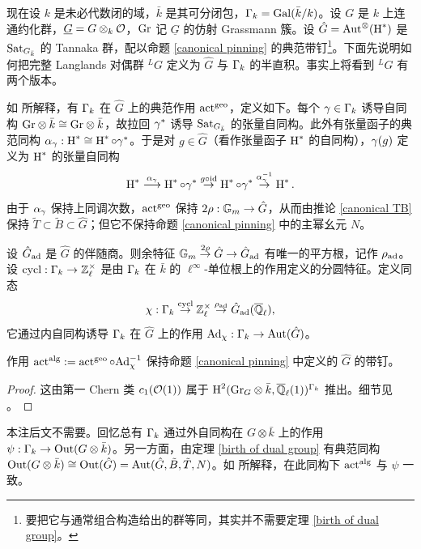 现在设 $k$ 是未必代数闭的域，$\bar k$ 是其可分闭包，${\Gamma}_k={\operatorname{Gal}}(\bar k/k)$。设 $G$ 是 $k$ 上连通约化群，$\underline G=G\otimes_k{\mathcal O}$，${\operatorname{Gr}}$ 记 $\underline G$ 的仿射 Grassmann 簇。设 $\hat G={\operatorname{Aut}}^{\otimes}(\operatorname{H}^*)$ 是 ${\operatorname{Sat}}_{G_{\bar k}}$ 的 Tannaka 群，配以命题 \ref{canonical pinning} 的典范带钉\footnote{要把它与通常组合构造给出的群等同，其实并不需要定理 \ref{birth of dual group}。}。下面先说明如何把完整 Langlands 对偶群 ${^L}G$ 定义为 $\hat G$ 与 ${\Gamma}_k$ 的半直积。事实上将看到 ${^L}G$ 有两个版本。

如 \cite{RZ} 所解释，有 ${\Gamma}_k$ 在 $\hat G$ 上的典范作用 $\operatorname{act}^{\operatorname{geo}}$，定义如下。每个 ${\gamma}\in {\Gamma}_k$ 诱导自同构 ${\operatorname{Gr}}\otimes \bar k\cong {\operatorname{Gr}}\otimes \bar k$，故拉回 ${\gamma}^*$ 诱导 ${\operatorname{Sat}}_{G_{\bar k}}$ 的张量自同构。此外有张量函子的典范同构 ${\alpha}_{\gamma}: \operatorname{H}^*\cong \operatorname{H}^*\circ {\gamma}^*$。于是对 $g\in \hat G$（看作张量函子 $\operatorname{H}^*$ 的自同构），${\gamma}(g)$ 定义为 $\operatorname{H}^*$ 的张量自同构
\begin{equation}\label{gaaction}
\operatorname{H}^*\stackrel{{\alpha}_{\gamma}}{\longrightarrow}\operatorname{H}^*\circ{\gamma}^*\stackrel{g\circ {\operatorname{id}}}{\to}\operatorname{H}^*\circ{\gamma}^*\stackrel{{\alpha}^{-1}_{\gamma}}{\to}\operatorname{H}^*.
\end{equation}
由于 ${\alpha}_{\gamma}$ 保持上同调次数，$\operatorname{act}^{\operatorname{geo}}$ 保持 $2\rho:{\mathbb G}_m\to \hat G$，从而由推论 \ref{canonical TB} 保持 $\tilde T\subset \tilde B\subset \hat G$；但它不保持命题 \ref{canonical pinning} 中的主幂幺元 $N$。

设 $\hat G_{\operatorname{ad}}$ 是 $\hat G$ 的伴随商。则余特征 ${\mathbb G}_m\stackrel{2\rho}{\to} \hat G\to \hat G_{\operatorname{ad}}$ 有唯一的平方根，记作 $\rho_{\operatorname{ad}}$。设 $\operatorname{cycl}:{\Gamma}_k\to{\mathbb Z}_\ell^\times$ 是由 ${\Gamma}_k$ 在 $\bar k$ 的 $\ell^\infty$-单位根上的作用定义的分圆特征。定义同态
\[\chi:{\Gamma}_k\stackrel{\operatorname{cycl}}{\to} {\mathbb Z}_\ell^\times\stackrel{\rho_{\operatorname{ad}}}{\to} \hat G_{{\operatorname{ad}}}({\overline{{\mathbb Q}}_\ell}),\]
它通过内自同构诱导 ${\Gamma}_k$ 在 $\hat G$ 上的作用 ${\operatorname{Ad}}_{\chi}:{\Gamma}_k\to{\operatorname{Aut}}(\hat G)$。

\begin{lem}\label{comparison}
作用 $\operatorname{act}^{\operatorname{alg}}:=\operatorname{act}^{\operatorname{geo}}\circ {\operatorname{Ad}}^{-1}_{\chi}$ 保持命题 \ref{canonical pinning} 中定义的 $\hat G$ 的带钉。
\end{lem}

\begin{proof}
这由第一 Chern 类 $c_1({\mathcal O}(1))$ 属于 $\operatorname{H}^2({\operatorname{Gr}}_G\otimes\bar k, {\overline{{\mathbb Q}}_\ell}(1))^{{\Gamma}_k}$ 推出。细节见 \cite[Proposition A.6]{RZ}。
\end{proof}

\begin{rmk}
本注后文不需要。回忆总有 ${\Gamma}_k$ 通过外自同构在 $G\otimes \bar k$ 上的作用 $\psi: {\Gamma}_k\to \operatorname{Out}(G\otimes \bar k)$。另一方面，由定理 \ref{birth of dual group} 有典范同构 $\operatorname{Out}(G\otimes\bar k)\cong \operatorname{Out}(\hat G)={\operatorname{Aut}}(\hat G, \tilde B, \tilde T, N)$。如 \cite{RZ} 所解释，在此同构下 $\operatorname{act}^{\operatorname{alg}}$ 与 $\psi$ 一致。
\end{rmk}


